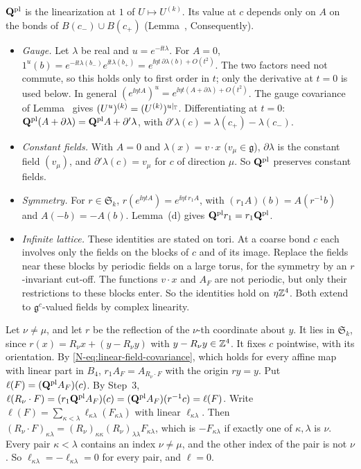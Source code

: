 \begin{step}[(b): covariance]
$\mathbf Q^{\rm pl}$ is the linearization at $1$ of $U\mapsto U^{(k)}$. Its value at $c$ depends only on $A$ on the bonds of $B(c_-)\cup B(c_+)$ (Lemma~, Consequently).
\begin{itemize}
\item \emph{Gauge.} Let $\lambda$ be real and $u=e^{-\ii t\lambda}$. For $A=0$, $1^u(b)=e^{-\ii t\lambda(b_-)}e^{\ii t\lambda(b_+)}=e^{\ii\eta t\,\partial\lambda(b)+O(t^2)}$. The two factors need not commute, so this holds only to first order in $t$; only the derivative at $t=0$ is used below. In general $(e^{\ii\eta tA})^u=e^{\ii\eta t(A+\partial\lambda)+O(t^2)}$. The gauge covariance of Lemma~ gives $(U^u)^{(k)}=(U^{(k)})^{u|_\mathbb T}$. Differentiating at $t=0$: $\mathbf Q^{\rm pl}(A+\partial\lambda)=\mathbf Q^{\rm pl}A+\partial'\lambda$, with $\partial'\lambda(c)=\lambda(c_+)-\lambda(c_-)$.
\item \emph{Constant fields.} With $A=0$ and $\lambda(x)=v\cdot x$ ($v_\mu\in\mathfrak g$), $\partial\lambda$ is the constant field $(v_\mu)$, and $\partial'\lambda(c)=v_\mu$ for $c$ of direction $\mu$. So $\mathbf Q^{\rm pl}$ preserves constant fields.
\item \emph{Symmetry.} For $r\in\mathfrak S_k$, $r(e^{\ii\eta tA})=e^{\ii\eta t\,r_1A}$, with $(r_1A)(b)=A(r^{-1}b)$ and $A(-b)=-A(b)$. Lemma~(d) gives $\mathbf Q^{\rm pl}r_1=r_1\mathbf Q^{\rm pl}$.
\item \emph{Infinite lattice.} These identities are stated on tori. At a coarse bond $c$ each involves only the fields on the blocks of $c$ and of its image. Replace the fields near these blocks by periodic fields on a large torus, for the symmetry by an $r$-invariant cut-off. The functions $v\cdot x$ and $A_F$ are not periodic, but only their restrictions to these blocks enter. So the identities hold on $\eta\mathbb Z^4$. Both extend to $\mathfrak g^c$-valued fields by complex linearity.
\end{itemize}
\end{step}

\begin{step}[(b): reflections]
Let $\nu\ne\mu$, and let $r$ be the reflection of the $\nu$-th coordinate about $y$. It lies in $\mathfrak S_k$, since $r(x)=R_\nu x+(y-R_\nu y)$ with $y-R_\nu y\in\mathbb Z^4$. It fixes $c$ pointwise, with its orientation. By \eqref{N-eq:linear-field-covariance}, which holds for every affine map with linear part in $B_4$, $r_1A_F=A_{R_\nu\cdot F}$ with the origin $ry=y$. Put $\ell(F)=(\mathbf Q^{\rm pl}A_F)(c)$. By Step~3, $\ell(R_\nu\cdot F)=(r_1\mathbf Q^{\rm pl}A_F)(c)=(\mathbf Q^{\rm pl}A_F)(r^{-1}c)=\ell(F)$. Write $\ell(F)=\sum_{\kappa<\lambda}\ell_{\kappa\lambda}(F_{\kappa\lambda})$ with linear $\ell_{\kappa\lambda}$. Then $(R_\nu\cdot F)_{\kappa\lambda}=(R_\nu)_{\kappa\kappa}(R_\nu)_{\lambda\lambda}F_{\kappa\lambda}$, which is $-F_{\kappa\lambda}$ if exactly one of $\kappa,\lambda$ is $\nu$. Every pair $\kappa<\lambda$ contains an index $\nu\ne\mu$, and the other index of the pair is not $\nu$. So $\ell_{\kappa\lambda}=-\ell_{\kappa\lambda}=0$ for every pair, and $\ell=0$.
\end{step}

